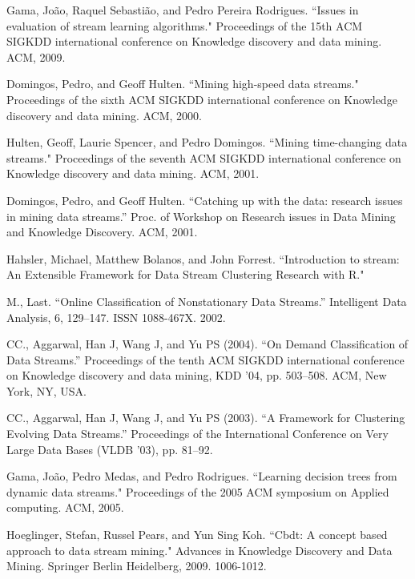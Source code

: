 \documentclass[conference]{IEEEtran}
\begin{document}
		
		\begin{thebibliography}{9}
			Gama, João, Raquel Sebastião, and Pedro Pereira  Rodrigues. ``Issues in evaluation of stream learning algorithms." Proceedings of the 15th ACM SIGKDD international conference on Knowledge discovery and data mining. ACM, 2009.
			
			Domingos, Pedro, and Geoff Hulten. ``Mining high-speed data streams." Proceedings of the sixth ACM SIGKDD international conference on Knowledge discovery and data mining. ACM, 2000.
			
			Hulten, Geoff, Laurie Spencer, and Pedro Domingos. ``Mining time-changing data streams." 
			Proceedings of the seventh ACM SIGKDD international conference on Knowledge discovery and data mining. ACM, 2001.
			
			Domingos, Pedro, and Geoff Hulten. ``Catching up with the data: research issues in mining data streams.'' Proc. of Workshop on Research issues in Data Mining and Knowledge Discovery. ACM, 2001.
			
			Hahsler, Michael, Matthew Bolanos, and John Forrest. ``Introduction to stream: An Extensible Framework for Data Stream Clustering Research with R."
				
			M., Last. “Online Classification of Nonstationary Data Streams.” Intelligent Data Analysis, 6, 129–147. ISSN 1088-467X. 2002.
				
			CC., Aggarwal, Han J, Wang J, and Yu PS (2004). “On Demand Classification of Data Streams.”  
				Proceedings of the tenth ACM SIGKDD international conference on Knowledge discovery
				and data mining, KDD ’04, pp. 503–508. ACM, New York, NY, USA.
				
			CC., Aggarwal, Han J, Wang J, and Yu PS (2003). “A Framework for Clustering Evolving Data
				Streams.” Proceedings of the International Conference on Very Large Data Bases (VLDB
				’03), pp. 81–92.
				
			Gama, João, Pedro Medas, and Pedro Rodrigues. ``Learning decision trees from dynamic data streams." Proceedings of the 2005 ACM symposium on Applied computing. ACM, 2005.
				
				Hoeglinger, Stefan, Russel Pears, and Yun Sing Koh. ``Cbdt: A concept based approach to data stream mining." Advances in Knowledge Discovery and Data Mining. Springer Berlin Heidelberg, 2009. 1006-1012.
				

\end{thebibliography}
\end{document}
